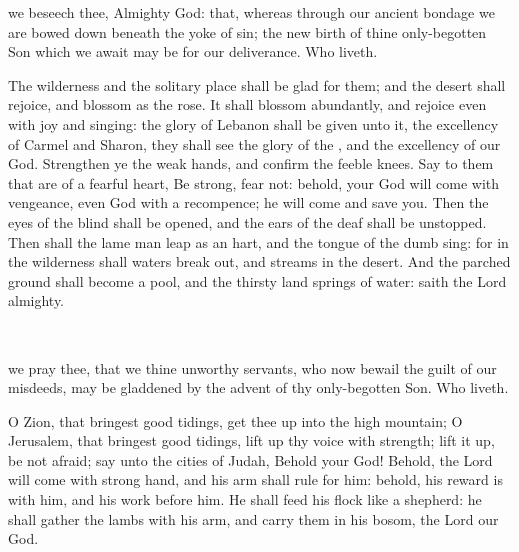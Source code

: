 \clearpage

\collect
{} we beseech thee, Almighty God: that, whereas through our ancient bondage we are bowed down beneath the yoke of sin; the new birth of thine only-begotten Son which we await may be for our deliverance. Who liveth.

 The wilderness and the solitary place shall be glad for them; and the desert shall rejoice, and blossom as the rose. It shall blossom abundantly, and rejoice even with joy and singing: the glory of Lebanon shall be given unto it, the excellency of Carmel and Sharon, they shall see the glory of the , and the excellency of our God. Strengthen ye the weak hands, and confirm the feeble knees. Say to them that are of a fearful heart, Be strong, fear not: behold, your God will come with vengeance, even God with a recompence; he will come and save you. Then the eyes of the blind shall be opened, and the ears of the deaf shall be unstopped. Then shall the lame man leap as an hart, and the tongue of the dumb sing: for in the wilderness shall waters break out, and streams in the desert. And the parched ground shall become a pool, and the thirsty land springs of water: %
saith the Lord almighty.

\\


\collect
{} we pray thee, that we thine unworthy servants, who now bewail the guilt of our misdeeds, may be gladdened by the advent of thy only-begotten Son. Who liveth.

 O Zion, that bringest good tidings, get thee up into the high mountain; O Jerusalem, that bringest good tidings, lift up thy voice with strength; lift it up, be not afraid; say unto the cities of Judah, Behold your God! Behold, the Lord  will come with strong hand, and his arm shall rule for him: behold, his reward is with him, and his work before him. He shall feed his flock like a shepherd: he shall gather the lambs with his arm, and carry them in his bosom,
the Lord our God.

